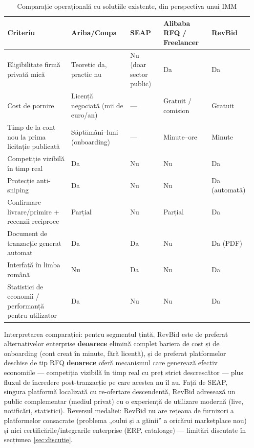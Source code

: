 \begin{table}[!ht]\footnotesize\linespread{1}
\centering
\caption{Comparație operațională cu soluțiile existente, din perspectiva unui IMM}
\label{tab:comparatie-finala}
\begin{tabular}{>{\raggedright\arraybackslash}p{4.2cm} >{\raggedright\arraybackslash}p{2.6cm} >{\raggedright\arraybackslash}p{2.4cm} >{\raggedright\arraybackslash}p{2.6cm} >{\raggedright\arraybackslash}p{2.4cm}}
\toprule
\textbf{Criteriu} & \textbf{Ariba/Coupa} & \textbf{SEAP} & \textbf{Alibaba RFQ / Freelancer} & \textbf{RevBid} \\
\midrule
Eligibilitate firmă privată mică & Teoretic da, practic nu & Nu (doar sector public) & Da & Da \\
Cost de pornire & Licență negociată (mii de euro/an) & --- & Gratuit / comision & Gratuit \\
Timp de la cont nou la prima licitație publicată & Săptămâni--luni (onboarding) & --- & Minute--ore & Minute \\
Competiție vizibilă în timp real & Da & Nu & Nu & Da \\
Protecție anti-sniping & Da & Nu & Nu & Da (automată) \\
Confirmare livrare/primire + recenzii reciproce & Parțial & Nu & Parțial & Da \\
Document de tranzacție generat automat & Da & Da & Nu & Da (PDF) \\
Interfață în limba română & Nu & Da & Nu & Da \\
Statistici de economii / performanță pentru utilizator & Da & Nu & Nu & Da \\
\bottomrule
\end{tabular}
\end{table}

Interpretarea comparației: pentru segmentul țintă, RevBid este de preferat alternativelor enterprise \textbf{deoarece} elimină complet bariera de cost și de onboarding (cont creat în minute, fără licență), și de preferat platformelor deschise de tip RFQ \textbf{deoarece} oferă mecanismul care generează efectiv economiile --- competiția vizibilă în timp real cu preț strict descrescător \cite{jap2002, carter2004} --- plus fluxul de încredere post-tranzacție pe care acestea nu îl au. Față de SEAP, singura platformă localizată cu re-ofertare descendentă, RevBid adresează un public complementar (mediul privat) cu o experiență de utilizare modernă (live, notificări, statistici). Reversul medaliei: RevBid nu are rețeaua de furnizori a platformelor consacrate (problema „oului și a găinii'' a oricărui marketplace nou) și nici certificările/integrarile enterprise (ERP, cataloage) --- limitări discutate în secțiunea \ref{sec:discutie}.

